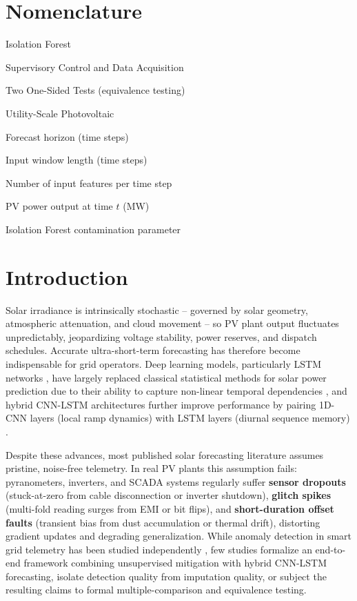 \documentclass[conference]{IEEEtran}
\begin{document}
\section*{Nomenclature}
\noindent
\begin{IEEEdescription}
\item[IF] Isolation Forest
\item[SCADA] Supervisory Control and Data Acquisition
\item[TOST] Two One-Sided Tests (equivalence testing)
\item[UPV] Utility-Scale Photovoltaic
\item[$H$] Forecast horizon (time steps)
\item[$W$] Input window length (time steps)
\item[$F$] Number of input features per time step
\item[$P(t)$] PV power output at time $t$ (MW)
\item[$\gamma$] Isolation Forest contamination parameter
\end{IEEEdescription}

\section{Introduction}

Solar irradiance is intrinsically stochastic -- governed by solar geometry, atmospheric attenuation, and cloud movement -- so PV plant output fluctuates unpredictably, jeopardizing voltage stability, power reserves, and dispatch schedules. Accurate ultra-short-term forecasting has therefore become indispensable for grid operators. Deep learning models, particularly LSTM networks \cite{hochreiter1997lstm}, have largely replaced classical statistical methods for solar power prediction due to their ability to capture non-linear temporal dependencies \cite{mellit2021deep, sobri2018review}, and hybrid CNN-LSTM architectures further improve performance by pairing 1D-CNN layers (local ramp dynamics) with LSTM layers (diurnal sequence memory) \cite{zang2020cnnlstm, obiora2021hourly, qu2021dayahead, boucetta2024enhanced}.

Despite these advances, most published solar forecasting literature assumes pristine, noise-free telemetry. In real PV plants this assumption fails: pyranometers, inverters, and SCADA systems regularly suffer \textbf{sensor dropouts} (stuck-at-zero from cable disconnection or inverter shutdown), \textbf{glitch spikes} (multi-fold reading surges from EMI or bit flips), and \textbf{short-duration offset faults} (transient bias from dust accumulation or thermal drift), distorting gradient updates and degrading generalization. While anomaly detection in smart grid telemetry has been studied independently \cite{zhang2021survey}, few studies formalize an end-to-end framework combining unsupervised mitigation with hybrid CNN-LSTM forecasting, isolate detection quality from imputation quality, or subject the resulting claims to formal multiple-comparison and equivalence testing.
\end{document}
